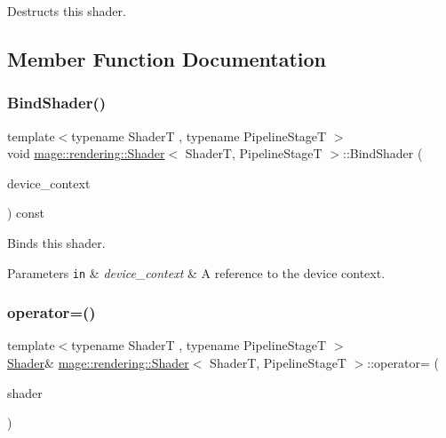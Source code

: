 Destructs this shader. 

\subsection{Member Function Documentation}
\hypertarget{classmage_1_1rendering_1_1_shader_abb37464c991b9b49e94c93968e884f13}{}\label{classmage_1_1rendering_1_1_shader_abb37464c991b9b49e94c93968e884f13} 
\subsubsection{\texorpdfstring{Bind\+Shader()}{BindShader()}}
{\footnotesize\ttfamily template$<$typename ShaderT , typename Pipeline\+StageT $>$ \\
void \hyperlink{classmage_1_1rendering_1_1_shader}{mage\+::rendering\+::\+Shader}$<$ ShaderT, Pipeline\+StageT $>$\+::Bind\+Shader (\begin{DoxyParamCaption}\item[{I\+D3\+D11\+Device\+Context \&}]{device\+\_\+context }\end{DoxyParamCaption}) const\hspace{0.3cm}{\ttfamily [noexcept]}}

Binds this shader.


\begin{DoxyParams}[1]{Parameters}
\mbox{\tt in}  & {\em device\+\_\+context} & A reference to the device context. \\
\hline
\end{DoxyParams}
\hypertarget{classmage_1_1rendering_1_1_shader_a66253b5dd8a5ef1cd766512b4ab15e6c}{}\label{classmage_1_1rendering_1_1_shader_a66253b5dd8a5ef1cd766512b4ab15e6c} 
\subsubsection{\texorpdfstring{operator=()}{operator=()}\hspace{0.1cm}{\footnotesize\ttfamily [1/2]}}
{\footnotesize\ttfamily template$<$typename ShaderT , typename Pipeline\+StageT $>$ \\
\hyperlink{classmage_1_1rendering_1_1_shader}{Shader}\& \hyperlink{classmage_1_1rendering_1_1_shader}{mage\+::rendering\+::\+Shader}$<$ ShaderT, Pipeline\+StageT $>$\+::operator= (\begin{DoxyParamCaption}\item[{const \hyperlink{classmage_1_1rendering_1_1_shader}{Shader}$<$ ShaderT, Pipeline\+StageT $>$ \&}]{shader }\end{DoxyParamCaption})\hspace{0.3cm}{\ttfamily [delete]}}

